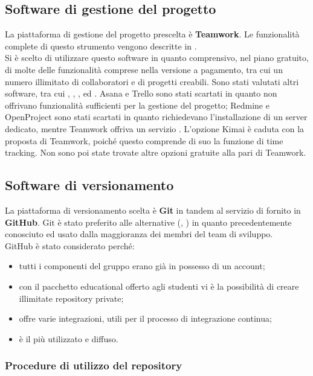 \subsection{Software di gestione del progetto}
La piattaforma di gestione del progetto prescelta è \textbf{Teamwork}. Le funzionalità complete di questo strumento vengono descritte in .\\
Si è scelto di utilizzare questo software in quanto comprensivo, nel piano gratuito, di molte delle funzionalità comprese nella versione a pagamento, tra cui un numero illimitato di collaboratori e di progetti creabili. Sono stati valutati altri software, tra cui , , ,  ed . Asana e Trello sono stati scartati in quanto non offrivano funzionalità sufficienti per la gestione del progetto; Redmine e OpenProject sono stati scartati in quanto richiedevano l'installazione di un server dedicato, mentre Teamwork offriva un servizio . L'opzione Kimai è caduta con la proposta di Teamwork, poiché questo comprende di suo la funzione di time tracking. Non sono poi state trovate altre opzioni gratuite alla pari di Teamwork.

\subsection{Software di versionamento}
La piattaforma di versionamento scelta è \textbf{Git} in tandem al servizio di  fornito in \textbf{GitHub}. Git è stato preferito alle alternative (, ) in quanto precedentemente conosciuto ed usato dalla maggioranza dei membri del team di sviluppo.\\
GitHub è stato considerato perché:
\begin{itemize}
	\item tutti i componenti del gruppo erano già in possesso di un account;
	\item con il pacchetto educational offerto agli studenti vi è la possibilità di creare illimitate repository private;
	\item offre varie integrazioni, utili per il processo di integrazione continua;
	\item è il più utilizzato e diffuso.
\end{itemize}

\newpage
\subsubsection{Procedure di utilizzo del repository}

